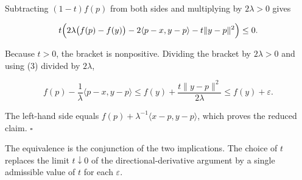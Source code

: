 \documentclass[11pt,a4paper]{article}
\begin{document}
Subtracting \((1-t)f(p)\) from both sides and multiplying by \(2\lambda>0\) gives


\[t\Bigl(2\lambda\bigl(f(p)-f(y)\bigr)-2\langle p-x,y-p\rangle-t\|y-p\|^2\Bigr)\le0.\]


Because \(t>0\), the bracket is nonpositive. Dividing the bracket by \(2\lambda>0\) and using (3) divided by \(2\lambda\),


\[f(p)-\frac1\lambda\langle p-x,y-p\rangle\le f(y)+\frac{t\|y-p\|^2}{2\lambda}\le f(y)+\varepsilon.\]


The left-hand side equals \(f(p)+\lambda^{-1}\langle x-p,y-p\rangle\), which proves the reduced claim. \(\square\)




The equivalence is the conjunction of the two implications. The choice of \(t\) replaces the limit \(t\downarrow0\) of the directional-derivative argument by a single admissible value of \(t\) for each \(\varepsilon\).
\end{document}
